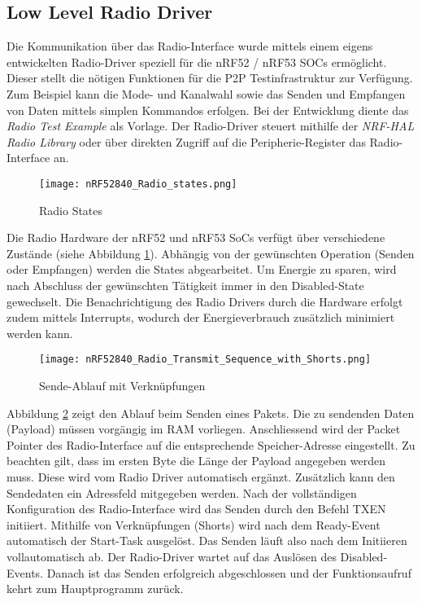 \subsection{Low Level Radio Driver}\label{sec:LowLevelRadioDriver}

Die Kommunikation über das Radio-Interface wurde mittels einem eigens entwickelten Radio-Driver speziell für die nRF52 / nRF53 SOCs ermöglicht. Dieser stellt die nötigen Funktionen für die P2P Testinfrastruktur zur Verfügung. Zum Beispiel kann die Mode- und Kanalwahl sowie das Senden und Empfangen von Daten mittels simplen Kommandos erfolgen. Bei der Entwicklung diente das \textit{Radio Test Example} \cite{nrf_connect_sdk_radio_test_example_2020} als Vorlage. Der Radio-Driver steuert mithilfe der \textit{NRF-HAL Radio Library} oder über direkten Zugriff auf die Peripherie-Register das Radio-Interface an.

\begin{figure} [H]
	\centering
	\texttt{[image: nRF52840\_Radio\_states.png]}
	\caption{Radio States \cite{nordic_semi_nrf_infocenter_radio_states_2020}}
	\label{fig:RadioStatesP2P}
\end{figure}

Die Radio Hardware der nRF52 und nRF53 SoCs verfügt über verschiedene Zustände (siehe Abbildung \ref{fig:RadioStatesP2P}). Abhängig von der gewünschten Operation (Senden oder Empfangen) werden die States abgearbeitet.
Um Energie zu sparen, wird nach Abschluss der gewünschten Tätigkeit immer in den Disabled-State gewechselt.
Die Benachrichtigung des Radio Drivers durch die Hardware erfolgt zudem mittels Interrupts, wodurch der Energieverbrauch zusätzlich minimiert werden kann.

\begin{figure} [H]
	\centering
	\texttt{[image: nRF52840\_Radio\_Transmit\_Sequence\_with\_Shorts.png]}
	\caption{Sende-Ablauf mit Verknüpfungen \cite{nordic_semi_nrf_infocenter_radio_transmit_sequence_2020}}
	\label{fig:RadioTransmitSequP2P}
\end{figure}

Abbildung \ref{fig:RadioTransmitSequP2P} zeigt den Ablauf beim Senden eines Pakets. Die zu sendenden Daten (Payload) müssen vorgängig im RAM vorliegen.
Anschliessend wird der Packet Pointer des Radio-Interface auf die entsprechende Speicher-Adresse eingestellt.
Zu beachten gilt, dass im ersten Byte die Länge der Payload angegeben werden muss.
Diese wird vom Radio Driver automatisch ergänzt.
Zusätzlich kann den Sendedaten ein Adressfeld mitgegeben werden. Nach der vollständigen Konfiguration des Radio-Interface wird das Senden durch den Befehl TXEN initiiert. Mithilfe von Verknüpfungen (Shorts) wird nach dem Ready-Event automatisch der Start-Task ausgelöst.
Das Senden läuft also nach dem Initiieren vollautomatisch ab.
Der Radio-Driver wartet auf das Auslösen des Disabled-Events.
Danach ist das Senden erfolgreich abgeschlossen und der Funktionsaufruf kehrt zum Hauptprogramm zurück.

